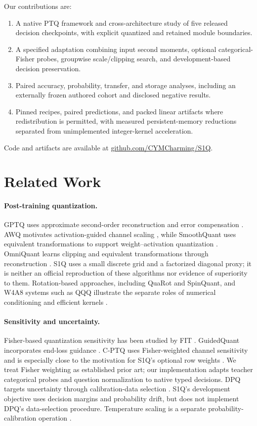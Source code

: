 \documentclass[10pt,twocolumn]{article}
\newcommand{\repo}{\href{https://github.com/CYMCharming/S1Q}{github.com/CYMCharming/S1Q}}
\begin{document}
Our contributions are:
\begin{enumerate}
 \item A native PTQ framework and cross-architecture study of five
 released decision checkpoints, with explicit quantized and retained
 module boundaries.
 \item A specified adaptation combining input second moments, optional
 categorical-Fisher probes, groupwise scale/clipping search, and
 development-based decision preservation.
 \item Paired accuracy, probability, transfer, and storage analyses,
 including an externally frozen authored cohort and disclosed negative results.
 \item Pinned recipes, paired predictions, and packed linear artifacts
 where redistribution is permitted, with measured persistent-memory
 reductions separated from unimplemented integer-kernel acceleration.
\end{enumerate}
Code and artifacts are available at \repo.

\section{Related Work}
\paragraph{Post-training quantization.}
GPTQ uses approximate second-order reconstruction and error compensation
\cite{frantar2023gptq}. AWQ motivates activation-guided channel scaling
\cite{lin2024awq}, while SmoothQuant uses equivalent transformations to
support weight--activation quantization \cite{xiao2023smoothquant}.
OmniQuant learns clipping and equivalent transformations through
reconstruction \cite{shao2024omniquant}. S1Q uses a small discrete
grid and a factorized diagonal proxy; it is neither an official
reproduction of these algorithms nor evidence of superiority to them.
Rotation-based approaches, including QuaRot and SpinQuant, and
W4A8 systems such as QQQ illustrate the separate roles of
numerical conditioning and efficient kernels
\cite{ashkboos2024quarot,liu2024spinquant,zhang2024qqq}.

\paragraph{Sensitivity and uncertainty.}
Fisher-based quantization sensitivity has been studied by FIT
\cite{zandonati2023fit}. GuidedQuant incorporates end-loss guidance
\cite{kim2025guidedquant}. C-PTQ uses Fisher-weighted channel sensitivity
and is especially close to the motivation for S1Q's optional row weights
\cite{li2026cptq}. We treat Fisher weighting as established prior art;
our implementation adapts teacher categorical probes and question
normalization to native typed decisions.
DPQ targets uncertainty through calibration-data selection
\cite{yang2026dpq}. S1Q's development objective uses decision margins
and probability drift, but does not implement DPQ's data-selection
procedure. Temperature scaling is a separate probability-calibration
operation \cite{guo2017calibration}.
\end{document}
